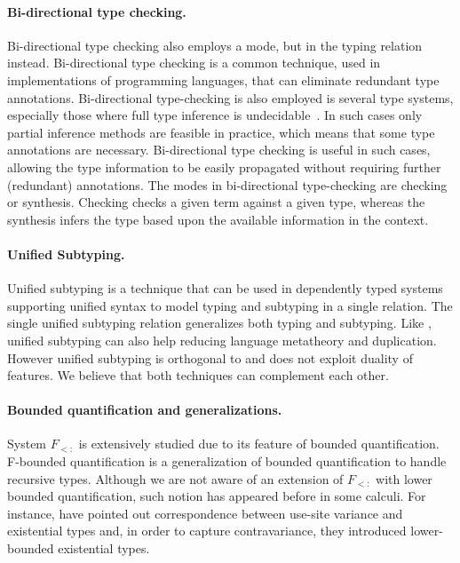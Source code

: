 \paragraph{Bi-directional type checking.}
Bi-directional type checking \citep{local,dunfield2019bidirectional}
also employs a mode, but in the typing relation
instead. Bi-directional type checking is a common technique, used in implementations
of programming languages, that can eliminate redundant type
annotations.  Bi-directional type-checking is also employed is
several type systems, especially those where full type inference is
undecidable~\citep{local,dunfield2013complete}.  In such cases only
partial inference methods are feasible in practice, which means that
some type annotations are necessary. Bi-directional type checking is
useful in such cases, allowing the type information to be easily
propagated without requiring further (redundant) annotations.  The
modes in bi-directional type-checking are checking or synthesis.
Checking checks a given term against a given type, whereas the
synthesis infers the type based upon the available information in the
context. 

\paragraph{Unified Subtyping.}
Unified subtyping \citep{yang2017unifying} is a technique that can be used
in dependently typed systems supporting unified syntax to model typing
and subtyping in a single relation. The single unified subtyping relation
generalizes both typing and subtyping. Like \nameduo, unified subtyping
can also help reducing language metatheory and duplication. However
unified subtyping is orthogonal to \nameduo and does not exploit duality
of features. We believe that both techniques can complement each other.

\begin{comment}
Lower-bounded quantification is not really new.  Igarashi and Viroli
>   have pointed out correspondence between (use-site) variance and
>   existential types and, in order to capture contravariance, they
>   introduced lower-bounded existential types.
> 
>   Atsushi Igarashi, Mirko Viroli: On Variance-Based Subtyping for
>   Parametric Types. ECOOP 2002: 441-469
\end{comment}

\paragraph{Bounded quantification and generalizations.}
System $F_{<:}$ \citep{cardelli1994extension} 
is extensively studied due to its feature of bounded
quantification. F-bounded
quantification \citep{canning1989f} is a generalization of bounded
quantification to handle recursive types.
Although we are not aware of an extension of $F_{<:}$ with lower
bounded quantification, such notion has appeared before
in some calculi. For instance, \cite{igarashi:2002:variance}
have pointed out correspondence between use-site variance and
existential types and, in order to capture contravariance, they
introduced lower-bounded existential types.

